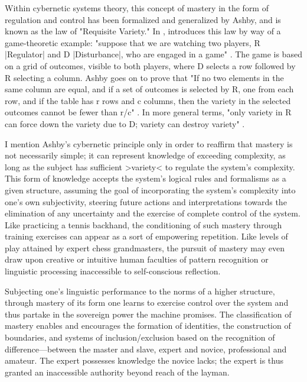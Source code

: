 Within cybernetic systems theory, this concept of mastery in the form of regulation and control has been formalized and generalized by Ashby, and is known as the law of "Requisite Variety." In , \citeauthor{Ashby1956} introduces this law by way of a game-theoretic example: "suppose that we are watching two players, R |Regulator| and D |Disturbance|, who are engaged in a game" \autocite[202]{Ashby1956}. The game is based on a grid of outcomes, visible to both players, where D selects a row followed by R selecting a column. Ashby goes on to prove that "If no two elements in the same column are equal, and if a set of outcomes is selected by R, one from each row, and if the table has r rows and c columns, then the variety in the selected outcomes cannot be fewer than r/c" \autocite[206]{Ashby1956}. In more general terms, "only variety in R can force down the variety due to D; variety can destroy variety" \autocite[207]{Ashby1956}.

I mention Ashby's cybernetic principle only in order to reaffirm that mastery is not necessarily simple; it can represent knowledge of exceeding complexity, as long as the subject has sufficient >variety< to regulate the system's complexity. This form of knowledge accepts the system's logical rules and formalisms as a given structure, assuming the goal of incorporating the system's complexity into one's own subjectivity, steering future actions and interpretations towards the elimination of any uncertainty and the exercise of complete control of the system. Like practicing a tennis backhand, the conditioning of such mastery through training exercises can appear as a sort of empowering repetition. Like levels of play attained by expert chess grandmasters, the pursuit of mastery may even draw upon creative or intuitive human faculties of pattern recognition or linguistic processing inaccessible to self-conscious reflection.

Subjecting one's linguistic performance to the norms of a higher structure, through mastery of its form one learns to exercise control over the system and thus partake in the sovereign power the machine promises. The classification of mastery enables and encourages the formation of identities, the construction of boundaries, and systems of inclusion/exclusion based on the recognition of difference---between the master and slave, expert and novice, professional and amateur. The expert possesses knowledge the novice lacks; the expert is thus granted an inaccessible authority beyond reach of the layman.

